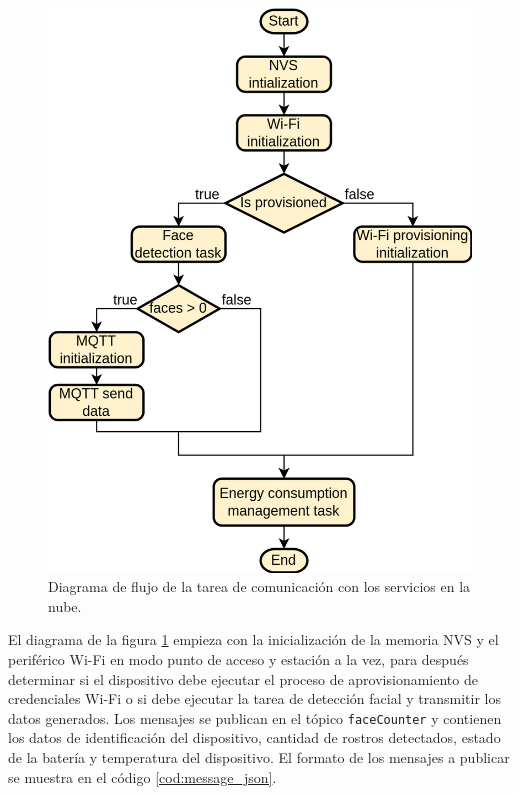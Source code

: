 \begin{figure}[h]
	\centering
	\includegraphics[scale=0.22]{./Figures/fw_comm_flow.png}
	\caption{Diagrama de flujo de la tarea de comunicación con los servicios en la nube.}
	\label{fig:fw_comm_flow}
\end{figure}

El diagrama de la figura \ref{fig:fw_comm_flow} empieza con la inicialización de la memoria NVS y el periférico Wi-Fi en modo punto de acceso y estación a la vez, para después determinar si el dispositivo debe ejecutar el proceso de aprovisionamiento de credenciales Wi-Fi o si debe ejecutar la tarea de detección facial y transmitir los datos generados. Los mensajes se publican en el tópico \texttt{faceCounter} y contienen los datos de identificación del dispositivo, cantidad de rostros detectados, estado de la batería y temperatura del dispositivo. El formato de los mensajes a publicar se muestra en el código \ref{cod:message_json}.

